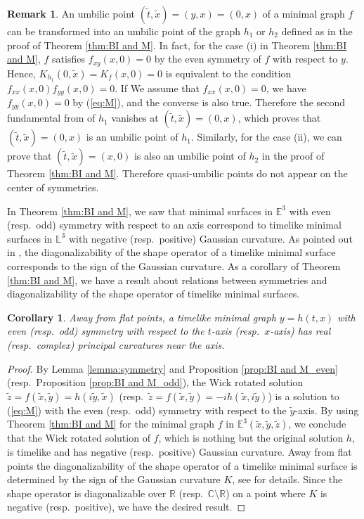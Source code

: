 \documentclass[12pt,amstex]{amsart}%
\theoremstyle{plain} %
\newtheorem{corollary}[theorem]{Corollary}
\theoremstyle{definition}
\newtheorem{remark}[theorem]{Remark}
\begin{document}
\begin{remark}
An umbilic point $(\tilde{t},\tilde{x})=(y,x)=(0,x)$ of a minimal graph $f$ can be transformed into an umbilic point of the graph $h_1$ or $h_2$ defined as in the proof of Theorem \ref{thm:BI and M}. In fact, for the case (i) in Theorem \ref{thm:BI and M}, $f$ satisfies $f_{xy}(x,0)=0$ by the even symmetry of $f$ with respect to $y$. Hence, $K_{h_1}(0,\tilde{x})=K_{f}(x,0)=0$ is equivalent to the condition $f_{xx}(x,0)f_{yy}(x,0)=0$. If We assume that $f_{xx}(x,0)=0$, we have $f_{yy}(x,0)=0$ by (\ref{eq:M}), and the converse is also true. Therefore the second fundamental from of $h_1$ vanishes at $(\tilde{t},\tilde{x})=(0,x)$, which proves that $(\tilde{t},\tilde{x})=(0,x)$ is an umbilic point of $h_1$. Similarly, for the case (ii), we can prove that $(\tilde{t},\tilde{x})=(x,0)$ is also an umbilic point of $h_2$ in the proof of Theorem \ref{thm:BI and M}. Therefore quasi-umbilic points do not appear on the center of symmetries.
\end{remark}

In Theorem \ref{thm:BI and M}, we saw that minimal surfaces in $\mathbb{E}^3$ with even (resp.\ odd) symmetry with respect to an axis correspond to timelike minimal surfaces in $\mathbb{L}^3$ with negative (resp.\ positive) Gaussian curvature. As pointed out in \cite{A2}, the diagonalizability of the shape operator of a timelike minimal surface corresponds to the sign of the Gaussian curvature. As a corollary of Theorem \ref{thm:BI and M}, we have a result about relations between symmetries and diagonalizability of the shape operator of timelike minimal surfaces.
\begin{corollary}\label{cor:symmetry1}
Away from flat points, a timelike minimal graph $y=h(t,x)$ with even (resp.\ odd) symmetry with respect to the $t$-axis (resp.\ $x$-axis) has real (resp.\ complex) principal curvatures near the axis.
\end{corollary}
\begin{proof}
By Lemma \ref{lemma:symmetry} and Proposition \ref{prop:BI and M_even} (resp.\ Proposition \ref{prop:BI and M_odd}), the Wick rotated solution $\tilde{z}=f(\tilde{x},\tilde{y})=h(i\tilde{y},\tilde{x})$ (resp.\ $\tilde{z}=f(\tilde{x},\tilde{y})=-ih(\tilde{x},i\tilde{y})$) is a solution to (\ref{eq:M}) with the even (resp.\ odd) symmetry with respect to the $\tilde{y}$-axis. By using Theorem \ref{thm:BI and M} for the minimal graph $f$ in $\mathbb{E}^3(\tilde{x},\tilde{y},\tilde{z})$, we conclude that the Wick rotated solution of $f$, which is nothing but the original solution $h$, is timelike and has negative (resp.\ positive) Gaussian curvature. Away from flat points the diagonalizability of the shape operator of a timelike minimal surface is determined by the sign of the Gaussian curvature $K$, see \cite{A2} for details. Since the shape operator is diagonalizable over $\mathbb{R}$ (resp.\ $\mathbb{C}\setminus \mathbb{R}$) on a point where $K$ is negative (resp.\ positive), we have the desired result.
\end{proof}
\end{document}

